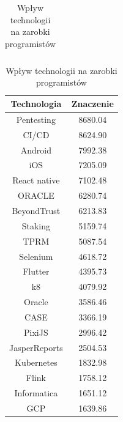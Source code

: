 \documentclass{article}
\begin{document}
\begin{table}[H]
\begin{minipage}{0.45\textwidth}
\begin{tabular}{|c|c|}
        \end{tabular}
        \caption{Wpływ branży na zarobki programistów}
        \label{tab:industry}
    \end{minipage}
    \hfill
    \begin{minipage}{0.45\textwidth}
        \centering
        \begin{tabular}{|c|c|}
            \hline
            \textbf{Technologia} & \textbf{Znaczenie} \\ \hline
            Pentesting           & 8680.04            \\ \hline
            CI/CD                & 8624.90            \\ \hline
            Android              & 7992.38            \\ \hline
            iOS                  & 7205.09            \\ \hline
            React native         & 7102.48            \\ \hline
            ORACLE               & 6280.74            \\ \hline
            BeyondTrust          & 6213.83            \\ \hline
            Staking              & 5159.74            \\ \hline
            TPRM                 & 5087.54            \\ \hline
            Selenium             & 4618.72            \\ \hline
            Flutter              & 4395.73            \\ \hline
            k8                   & 4079.92            \\ \hline
            Oracle               & 3586.46            \\ \hline
            CASE                 & 3366.19            \\ \hline
            PixiJS               & 2996.42            \\ \hline
            JasperReports        & 2504.53            \\ \hline
            Kubernetes           & 1832.98            \\ \hline
            Flink                & 1758.12            \\ \hline
            Informatica          & 1651.12            \\ \hline
            GCP                  & 1639.86            \\ \hline
        \end{tabular}
        \caption{Wpływ technologii na zarobki programistów}
        \label{tab:technology}
    \end{minipage}
\end{table}
\end{document}
